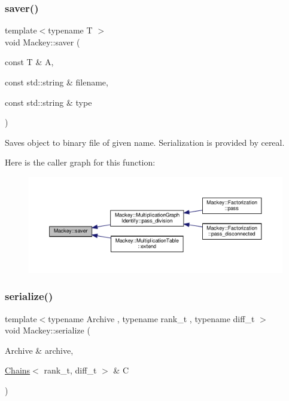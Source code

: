 \mbox{\label{namespaceMackey_a1824d780ce15f1845e4f87bf056feec9}} 
\subsubsection{\texorpdfstring{saver()}{saver()}}
{\footnotesize\ttfamily template$<$typename T $>$ \\
void Mackey\+::saver (\begin{DoxyParamCaption}\item[{const T \&}]{A,  }\item[{const std\+::string \&}]{filename,  }\item[{const std\+::string \&}]{type }\end{DoxyParamCaption})}



Saves object to binary file of given name. Serialization is provided by cereal. 

Here is the caller graph for this function\+:\nopagebreak
\begin{figure}[H]
\begin{center}
\leavevmode
\includegraphics[width=350pt]{namespaceMackey_a1824d780ce15f1845e4f87bf056feec9_icgraph}
\end{center}
\end{figure}
\mbox{\label{namespaceMackey_a43cf712cb611ddbafa91b005a911436e}} 
\subsubsection{\texorpdfstring{serialize()}{serialize()}\hspace{0.1cm}{\footnotesize\ttfamily [1/6]}}
{\footnotesize\ttfamily template$<$typename Archive , typename rank\+\_\+t , typename diff\+\_\+t $>$ \\
void Mackey\+::serialize (\begin{DoxyParamCaption}\item[{Archive \&}]{archive,  }\item[{\hyperlink{classMackey_1_1Chains}{Chains}$<$ rank\+\_\+t, diff\+\_\+t $>$ \&}]{C }\end{DoxyParamCaption})}



